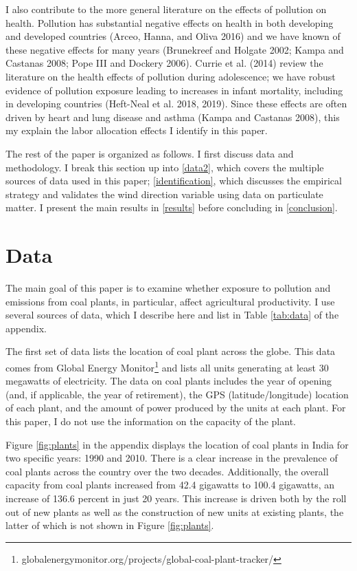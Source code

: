\documentclass[
]{article}
\begin{document}
I also contribute to the more general literature on the effects of pollution on health. Pollution has substantial negative effects on health in both developing and developed countries (Arceo, Hanna, and Oliva 2016) and we have known of these negative effects for many years (Brunekreef and Holgate 2002; Kampa and Castanas 2008; Pope III and Dockery 2006). Currie et al. (2014) review the literature on the health effects of pollution during adolescence; we have robust evidence of pollution exposure leading to increases in infant mortality, including in developing countries (Heft-Neal et al. 2018, 2019). Since these effects are often driven by heart and lung disease and asthma (Kampa and Castanas 2008), this my explain the labor allocation effects I identify in this paper.

The rest of the paper is organized as follows. I first discuss data and methodology. I break this section up into \autoref{data2}, which covers the multiple sources of data used in this paper; \autoref{identification}, which discusses the empirical strategy and validates the wind direction variable using data on particulate matter. I present the main results in \autoref{results} before concluding in \autoref{conclusion}.

\hypertarget{data}{%
\section{Data}\label{data}}

\label{data}

The main goal of this paper is to examine whether exposure to pollution and emissions from coal plants, in particular, affect agricultural productivity. I use several sources of data, which I describe here and list in Table \ref{tab:data} of the appendix.

The first set of data lists the location of coal plant across the globe. This data comes from Global Energy Monitor\footnote{globalenergymonitor.org/projects/global-coal-plant-tracker/} and lists all units generating at least 30 megawatts of electricity. The data on coal plants includes the year of opening (and, if applicable, the year of retirement), the GPS (latitude/longitude) location of each plant, and the amount of power produced by the units at each plant. For this paper, I do not use the information on the capacity of the plant.

Figure \ref{fig:plants} in the appendix displays the location of coal plants in India for two specific years: 1990 and 2010. There is a clear increase in the prevalence of coal plants across the country over the two decades. Additionally, the overall capacity from coal plants increased from 42.4 gigawatts to 100.4 gigawatts, an increase of 136.6 percent in just 20 years. This increase is driven both by the roll out of new plants as well as the construction of new units at existing plants, the latter of which is not shown in Figure \ref{fig:plants}.
\end{document}
